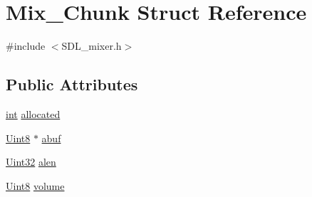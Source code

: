 \hypertarget{struct_mix___chunk}{\section{Mix\-\_\-\-Chunk Struct Reference}
\label{struct_mix___chunk}
}


{\ttfamily \#include $<$S\-D\-L\-\_\-mixer.\-h$>$}

\subsection*{Public Attributes}
\begin{DoxyCompactItemize}
\item 
\hyperlink{_s_d_l__thread_8h_a6a64f9be4433e4de6e2f2f548cf3c08e}{int} \hyperlink{struct_mix___chunk_a7b985b90b5f97fffe34834116a281615}{allocated}
\item 
\hyperlink{_s_d_l__stdinc_8h_a2944638813a090aa23e62f4da842c3e2}{Uint8} $\ast$ \hyperlink{struct_mix___chunk_a30b3b1a72677d076a1caa72422bb3774}{abuf}
\item 
\hyperlink{_s_d_l__stdinc_8h_add440eff171ea5f55cb00c4a9ab8672d}{Uint32} \hyperlink{struct_mix___chunk_a958507964471fc4b9fa0d215f1852d05}{alen}
\item 
\hyperlink{_s_d_l__stdinc_8h_a2944638813a090aa23e62f4da842c3e2}{Uint8} \hyperlink{struct_mix___chunk_afc566fd5da7f0ed1f3577f5bc0eac319}{volume}
\end{DoxyCompactItemize}


